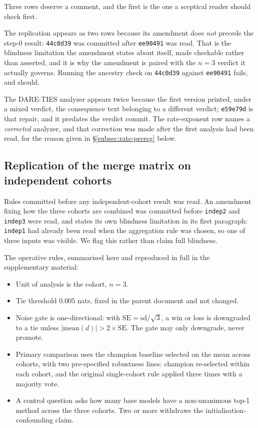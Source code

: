 Three rows deserve a comment, and the first is the one a sceptical reader
should check first.

The replication appears as two rows because its amendment does \emph{not}
precede the step-0 result: \texttt{44c0d39} was committed after
\texttt{ee90491} was read. That is the blindness limitation the amendment
states about itself, made checkable rather than asserted, and it is why the
amendment is paired with the $n=3$ verdict it actually governs. Running the
ancestry check on \texttt{44c0d39} against \texttt{ee90491} fails, and should.

The DARE-TIES analyzer appears twice because the first version printed, under a
mixed verdict, the consequence text belonging to a different verdict;
\texttt{e59e79d} is that repair, and it predates the verdict commit. The
rate-exponent row names a \emph{corrected} analyzer, and that correction was
made after the first analysis had been read, for the reason given in
\S\ref{subsec:rate-prereg} below.

\subsection{Replication of the merge matrix on independent cohorts}

Rules committed before any independent-cohort result was read. An
amendment fixing how the three cohorts are combined was committed before
\texttt{indep2} and \texttt{indep3} were read, and states its own
blindness limitation in its first paragraph: \texttt{indep1} had already
been read when the aggregation rule was chosen, so one of three inputs
was visible. We flag this rather than claim full blindness.

The operative rules, summarised here and reproduced in full in the
supplementary material:
\begin{itemize}
\item Unit of analysis is the cohort, $n = 3$.
\item Tie threshold $0.005$ nats, fixed in the parent document and not
  changed.
\item Noise gate is one-directional: with
  $\mathrm{SE} = \mathrm{sd}/\sqrt{3}$, a win or loss is downgraded to a
  tie unless $|\mathrm{mean}(d)| > 2\times\mathrm{SE}$. The gate may only
  downgrade, never promote.
\item Primary comparison uses the champion baseline selected on the mean
  across cohorts, with two pre-specified robustness lines: champion
  re-selected within each cohort, and the original single-cohort rule
  applied three times with a majority vote.
\item A control question asks how many base models have a non-unanimous
  top-1 method across the three cohorts. Two or more withdraws the
  initialisation-confounding claim.
\end{itemize}


